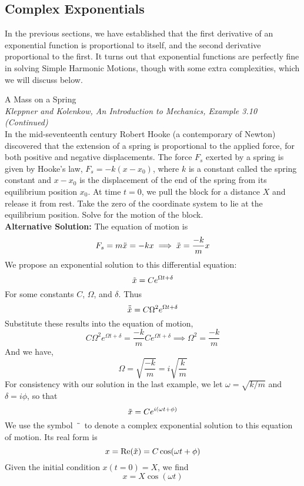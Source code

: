 \documentclass[11pt]{article}
\theoremstyle{gangnamstyle}{\newtheorem{definition}{Definition}[]}
\theoremstyle{gangnamstyle}{\newtheorem{example}{Example}[]}
\theoremstyle{gangnamstyle}{\newtheorem{problem}{Problem}[]}
\theoremstyle{gangnamstyle}{\newtheorem{warning}{Warning}[]}
\begin{document}
\subsection{Complex Exponentials}

In the previous sections, we have established that the first derivative of an exponential function is proportional to itself, and the second derivative proportional to the first. It turns out that exponential functions are perfectly fine in solving Simple Harmonic Motions, though with some extra complexities, which we will discuss below. 

\begin{example}
A Mass on a Spring \\
\textit{Kleppner and Kolenkow, An Introduction to Mechanics, Example 3.10 (Continued)} \\
In the mid-seventeenth century Robert Hooke (a contemporary of Newton) discovered that the extension of a spring is proportional to the applied force, for both positive and negative displacements. The force $F_s$ exerted by a spring is given by Hooke’s law, $F_s = -k(x - x_0)$, where $k$ is a constant called the spring constant and $x - x_0$ is the displacement of the end of the spring from its equilibrium position $x_0$. At time $t = 0$, we pull the block for a distance $X$ and release it from rest. Take the zero of the coordinate system to lie at the equilibrium position. Solve for the motion of the block. \\

\textbf{Alternative Solution:} The equation of motion is
\[ F_s = m\Ddot{x} = -kx \implies \Ddot{x} = \frac{-k}{m}x \]
We propose an exponential solution to this differential equation: 
\[ \Tilde{x} = Ce^{\Omega t + \delta} \]
For some constants $C$, $\Omega$, and $\delta$. Thus
\[ \Ddot{\Tilde{x}} = C\Omega^2e^{\Omega t + \delta} \]
Substitute these results into the equation of motion, 
\[ C\Omega^2e^{\Omega t + \delta} = \frac{-k}{m}Ce^{\Omega t + \delta} \implies \Omega^2 = \frac{-k}{m} \]
And we have, 
\[ \Omega = \sqrt{\frac{-k}{m}} = i\sqrt{\frac{k}{m}} \]
For consistency with our solution in the last example, we let $\omega = \sqrt{k/m}$ and $\delta = i\phi$, so that
\[ \Tilde{x} = Ce^{i(\omega t + \phi)} \]
We use the symbol $\ \Tilde{ } \ $ to denote a complex exponential solution to this equation of motion. Its real form is
\[ x = \Re(\Tilde{x}) = C\cos(\omega t + \phi) \]
Given the initial condition $x(t = 0) = X$, we find
\[ x = X\cos(\omega t) \]
\end{example}
\end{document}
